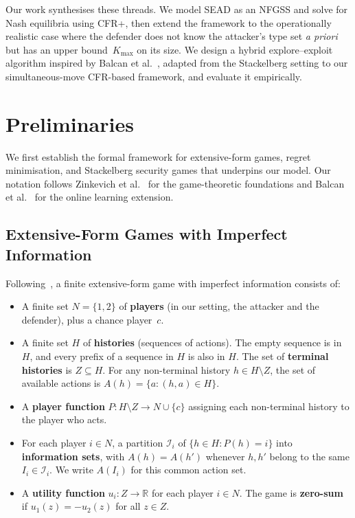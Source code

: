 \documentclass[sigconf]{aamas}
\newcommand{\Kmax}{K_{\max}}
\newcommand{\R}{\mathbb{R}}
\begin{document}
Our work synthesises these threads. We model SEAD as an NFGSS and solve for Nash equilibria using CFR+, then extend the framework to the operationally realistic case where the defender does not know the attacker's type set \emph{a priori} but has an upper bound~$\Kmax$ on its size. We design a hybrid explore--exploit algorithm inspired by Balcan et al.~\cite{Balcan2015}, adapted from the Stackelberg setting to our simultaneous-move CFR-based framework, and evaluate it empirically.

\section{Preliminaries}
\label{sec:prelim}

We first establish the formal framework for extensive-form games, regret minimisation, and Stackelberg security games that underpins our model. Our notation follows Zinkevich et al.~\cite{Zinkevich2007} for the game-theoretic foundations and Balcan et al.~\cite{Balcan2015} for the online learning extension.

\subsection{Extensive-Form Games with Imperfect Information}
\label{sec:efg}

Following~\cite{Osborne1994, Zinkevich2007}, a finite extensive-form game with imperfect information consists of:
\begin{itemize}
    \item A finite set $N = \{1, 2\}$ of \textbf{players} (in our setting, the attacker and the defender), plus a chance player~$c$.
    \item A finite set $H$ of \textbf{histories} (sequences of actions). The empty sequence is in $H$, and every prefix of a sequence in $H$ is also in $H$. The set of \textbf{terminal histories} is $Z \subseteq H$. For any non-terminal history $h \in H \setminus Z$, the set of available actions is $A(h) = \{a : (h, a) \in H\}$.
    \item A \textbf{player function} $P : H \setminus Z \to N \cup \{c\}$ assigning each non-terminal history to the player who acts.
    \item For each player $i \in N$, a partition $\mathcal{I}_i$ of $\{h \in H : P(h) = i\}$ into \textbf{information sets}, with $A(h) = A(h')$ whenever $h, h'$ belong to the same $I_i \in \mathcal{I}_i$. We write $A(I_i)$ for this common action set.
    \item A \textbf{utility function} $u_i : Z \to \R$ for each player $i \in N$. The game is \textbf{zero-sum} if $u_1(z) = -u_2(z)$ for all $z \in Z$.
\end{itemize}
\end{document}
